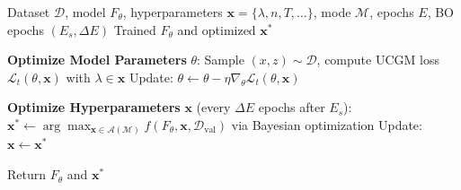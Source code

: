 \begin{algorithm}[t]
\caption{Dynamic Generative Modeling Optimization (DGMO)}
\label{alg:dgmo}
\begin{algorithmic}[1]
\Require Dataset $\mathcal{D}$, model $F_\theta$, hyperparameters $\mathbf{x} = \{\lambda, n, T, \ldots\}$, mode $\mathcal{M}$, epochs $E$, BO epochs $(E_s, \Delta E)$
\Ensure Trained $F_\theta$ and optimized $\mathbf{x}^*$

\Repeat
    \State \textbf{Optimize Model Parameters} $\theta$:
    \State \quad Sample $(x, z) \sim \mathcal{D}$, compute UCGM loss $\mathcal{L}_t(\theta, \mathbf{x})$ with $\lambda \in \mathbf{x}$
    \State \quad Update: $\theta \gets \theta - \eta \nabla_\theta \mathcal{L}_t(\theta, \mathbf{x})$
    
    \State \textbf{Optimize Hyperparameters} $\mathbf{x}$ (every $\Delta E$ epochs after $E_s$):
        \State \quad $\mathbf{x}^* \gets \arg\max_{\mathbf{x} \in \mathcal{A}(\mathcal{M})} f(F_\theta, \mathbf{x}, \mathcal{D}_{\text{val}})$ via Bayesian optimization
        \State \quad Update: $\mathbf{x} \gets \mathbf{x}^*$
    \EndIf
{}

\State Return $F_\theta$ and $\mathbf{x}^*$
\end{algorithmic}
\end{algorithm}

